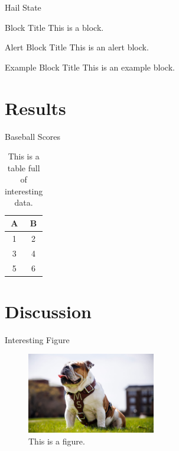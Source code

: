 \documentclass[aspectratio=169]{beamer}
\begin{document}
\begin{frame}{Hail State}
    \begin{block}{Block Title}
        This is a block.
    \end{block}
    \begin{alertblock}{Alert Block Title}
        This is an alert block.
    \end{alertblock}
    \begin{exampleblock}{Example Block Title}
        This is an example block.
    \end{exampleblock}
\end{frame}

\section{Results}

\begin{frame}{Baseball Scores}
    \begin{table}
        \centering
        \begin{tabular}{c|c}
            \hline
            A & B \\
            \hline
            1 & 2 \\
            3 & 4 \\
            5 & 6 \\
            \hline
        \end{tabular}
        \caption{This is a table full of interesting data.}
    \end{table}
\end{frame}

\section{Discussion}

\begin{frame}{Interesting Figure}
    \begin{figure}
        \centering
        \includegraphics[width=0.5\textwidth]{images/bully.jpg}
        \caption{This is a figure.}
    \end{figure}
\end{frame}
\end{document}
